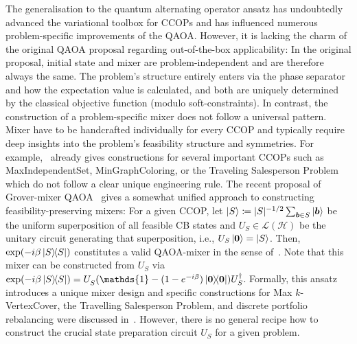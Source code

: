 \documentclass[10pt,conference]{IEEEtran}
\newcommand*{\hil}{\mathcal{H}}       %
\newcommand*{\solset}{S}              %
\newcommand*{\one}{\mathds{1}}        %
\newcommand*{\lo}{\mathcal{L}}        %
\begin{document}
The generalisation to the quantum alternating operator ansatz has undoubtedly advanced the variational toolbox for CCOPs and has influenced numerous problem-specific improvements of the QAOA.
However, it is lacking the charm of the original QAOA proposal regarding out-of-the-box applicability:
In the original proposal, initial state and mixer are problem-independent and are therefore always the same.
The problem's structure entirely enters via the phase separator and how the expectation value is calculated, and both are uniquely determined by the classical objective function (modulo soft-constraints).
In contrast, the construction of a problem-specific mixer does not follow a universal pattern.
Mixer have to be handcrafted individually for every CCOP and typically require deep insights into the problem's feasibility structure and symmetries.
For example,~\cite{Hadfield2019FromTheQuantumApproximateOptimizationAlgorithmToAQuantumAlternatingOperatorAnsatz} already gives constructions for several important CCOPs such as MaxIndependentSet, MinGraphColoring, or the Traveling Salesperson Problem which do not follow a clear unique engineering rule.
The recent proposal of Grover-mixer QAOA~\cite{Bartschi2020GroverMixersForQaoaShiftingComplexityFromMixerDesignToStatePreparation} gives a somewhat unified approach to constructing feasibility-preserving mixers:
For a given CCOP, let $\ket{\solset} \coloneqq \lvert \solset\rvert^{-1 / 2} \sum_{\bm{b} \in \solset} \ket{\bm{b}}$ be the uniform superposition of all feasible CB states and $U_{\solset} \in \lo(\hil)$ be the unitary circuit generating that superposition, i.e., $U_{\solset} \ket{\bm{0}} = \ket{\solset}$.
Then, $\exp(- i \beta \ketbra{\solset}{\solset})$ constitutes a valid QAOA-mixer in the sense of~\cite{Hadfield2019FromTheQuantumApproximateOptimizationAlgorithmToAQuantumAlternatingOperatorAnsatz}.
Note that this mixer can be constructed from $U_{\solset}$ via $\exp(-i \beta \ketbra{\solset}{\solset}) = U_{\solset}^{\vphantom{\dagger}} (\one - (1 - e^{-i \beta}) \ketbra{\bm{0}}{\bm{0}}) U_{\solset}^{\dagger}$.
Formally, this ansatz introduces a unique mixer design and specific constructions for Max $k$-VertexCover, the Travelling Salesperson Problem, and discrete portfolio rebalancing were discussed in~\cite{Bartschi2020GroverMixersForQaoaShiftingComplexityFromMixerDesignToStatePreparation}.
However, there is no general recipe how to construct the crucial state preparation circuit $U_{\solset}$ for a given problem.
\end{document}
